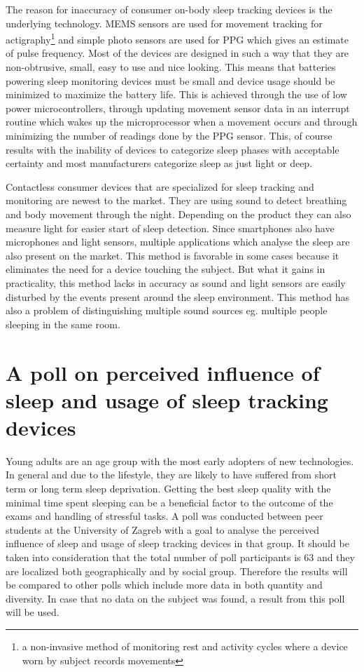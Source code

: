 The reason for inaccuracy of consumer on-body sleep tracking devices is the underlying technology. \ac{MEMS} sensors are used for movement tracking for actigraphy\footnote{a non-invasive method of monitoring rest and activity cycles where a device worn by subject records movements} and simple photo sensors are used for \ac{PPG} which gives an estimate of pulse frequency. Most of the devices are designed in such a way that they are non-obtrusive, small, easy to use and nice looking. This means that batteries powering sleep monitoring devices must be small and device usage should be minimized to maximize the battery life. This is achieved through the use of low power microcontrollers, through updating movement sensor data in an interrupt routine which wakes up the microprocessor when a movement occurs and through minimizing the number of readings done by the \ac{PPG} sensor. This, of course results with the inability of devices to categorize sleep phases with acceptable certainty and most manufacturers categorize sleep as just light or deep.

Contactless consumer devices that are specialized for sleep tracking and monitoring are newest to the market. They are using sound to detect breathing and body movement through the night. Depending on the product they can also measure light for easier start of sleep detection. Since smartphones also have microphones and light sensors, multiple applications which analyse the sleep are also present on the market. This method is favorable in some cases because it eliminates the need for a device touching the subject. But what it gains in practicality, this method lacks in accuracy as sound and light sensors are easily disturbed by the events present around the sleep environment. This method has also a problem of distinguishing multiple sound sources eg. multiple people sleeping in the same room.


\section{A poll on perceived influence of sleep and usage of sleep tracking devices}

Young adults are an age group with the most early adopters of new technologies. In general and due to the lifestyle, they are likely to have suffered from short term or long term sleep deprivation. Getting the best sleep quality with the minimal time spent sleeping can be a beneficial factor to the outcome of the exams and handling of stressful tasks. A poll was conducted between peer students at the University of Zagreb with a goal to analyse the perceived influence of sleep and usage of sleep tracking devices in that group. It should be taken into consideration that the total number of poll participants is 63 and they are localized both geographically and by social group. Therefore the results will be compared to other polls which include more data in both quantity and diversity. In case that no data on the subject was found, a result from this poll will be used.


